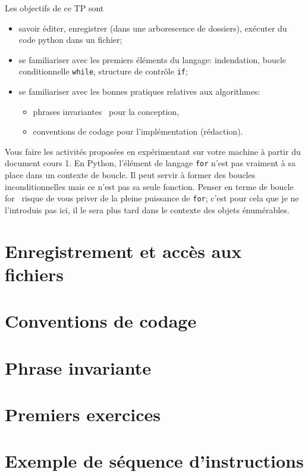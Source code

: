 

\usepackage{parcolumns}
\setlength{\parindent}{0pt}

 
Les objectifs de ce TP sont
\begin{itemize}
  \item  savoir éditer, enregistrer (dans une arborescence de dossiers), exécuter du code python dans un fichier;
  \item se familiariser avec les premiers éléments du langage: indendation, boucle conditionnelle \texttt{while}, structure de contrôle \texttt{if};
  \item se familiariser avec les bonnes pratiques relatives aux algorithmes:
  \begin{itemize}
    \item \og phrases invariantes\fg~ pour la conception,
    \item conventions de codage pour l'implémentation (rédaction).
  \end{itemize}
\end{itemize}
Vous faire les activités proposées en expérimentant sur votre machine à partir du document \og cours 1\fg.\newline
En Python, l'élément de langage \texttt{for} n'est pas vraiment à sa place dans un contexte de boucle. Il peut servir à former des boucles inconditionnelles mais ce n'est pas sa seule fonction. Penser en terme de \og boucle for\fg~ risque de vous priver de la pleine puissance de \texttt{for}; c'est pour cela que je ne l'introduis pas ici, il le sera plus tard dans le contexte des objets \og énumérables\fg.


\section{Enregistrement et accès aux fichiers}


\section{Conventions de codage}


\section{Phrase invariante}


\section{Premiers exercices}


\section{Exemple de séquence d'instructions}


